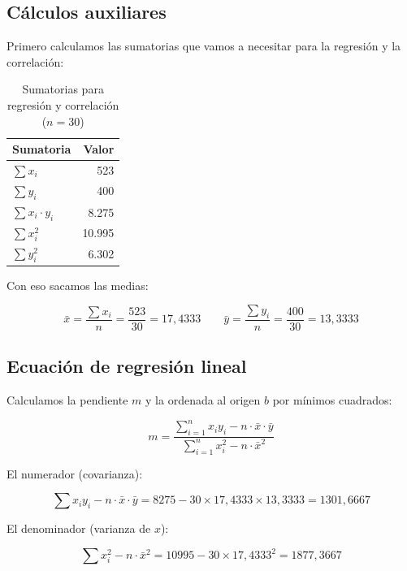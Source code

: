 \documentclass[12pt,a4paper]{article}
\begin{document}
\subsection{Cálculos auxiliares}

Primero calculamos las sumatorias que vamos a necesitar para la regresión y la correlación:

\vspace{6pt}
\begin{table}[H]
\centering
\caption{Sumatorias para regresión y correlación ($n = 30$)}
\vspace{4pt}
\begin{tabular}{lr}
\toprule
\textbf{Sumatoria} & \textbf{Valor} \\
\midrule
$\sum x_i$ & 523 \\[4pt]
$\sum y_i$ & 400 \\[4pt]
$\sum x_i \cdot y_i$ & 8.275 \\[4pt]
$\sum x_i^2$ & 10.995 \\[4pt]
$\sum y_i^2$ & 6.302 \\
\bottomrule
\end{tabular}
\end{table}
\vspace{4pt}

Con eso sacamos las medias:

\vspace{4pt}
$$\bar{x} = \frac{\sum x_i}{n} = \frac{523}{30} = 17{,}4333 \qquad \bar{y} = \frac{\sum y_i}{n} = \frac{400}{30} = 13{,}3333$$

\subsection{Ecuación de regresión lineal}

Calculamos la pendiente $m$ y la ordenada al origen $b$ por mínimos cuadrados:

\vspace{4pt}
$$m = \frac{\sum_{i=1}^{n} x_i y_i - n \cdot \bar{x} \cdot \bar{y}}{\sum_{i=1}^{n} x_i^2 - n \cdot \bar{x}^2}$$
\vspace{4pt}

El numerador (covarianza):

$$\sum x_i y_i - n \cdot \bar{x} \cdot \bar{y} = 8275 - 30 \times 17{,}4333 \times 13{,}3333 = 1301{,}6667$$

El denominador (varianza de $x$):

$$\sum x_i^2 - n \cdot \bar{x}^2 = 10995 - 30 \times 17{,}4333^2 = 1877{,}3667$$
\end{document}
